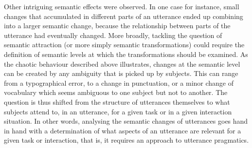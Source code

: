 Other intriguing semantic effects were observed. In one case for
instance, small changes that accumulated in different parts of an
utterance ended up combining into a larger semantic change, because the
relationship between parts of the utterance had eventually changed. More
broadly, tackling the question of semantic attraction (or more simply
semantic transformations) could require the definition of semantic
levels at which the transformations should be examined. As the chaotic
behaviour described above illustrates, changes at the semantic level can
be created by any ambiguity that is picked up by subjects. This can
range from a typographical error, to a change in punctuation, or a minor
change of vocabulary which seems ambiguous to one subject but not to
another. The question is thus shifted from the structure of utterances
themselves to what subjects attend to, in an utterance, for a given task
or in a given interaction situation. In other words, analysing the
semantic changes of utterances goes hand in hand with a determination of
what aspects of an utterance are relevant for a given task or
interaction, that is, it requires an approach to utterance pragmatics.


